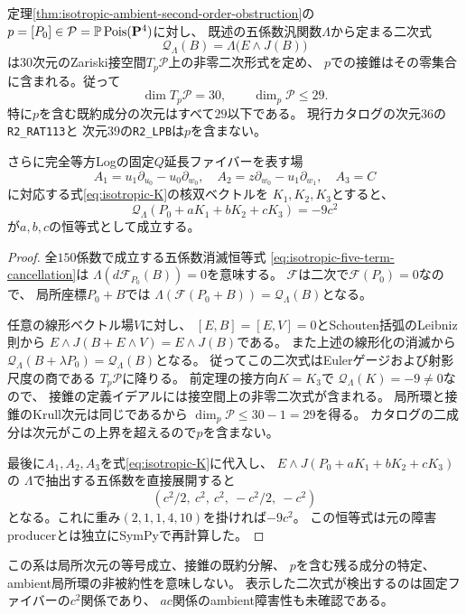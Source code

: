 \begin{corollary}[完全等方Log点での二次接錐と局所次元]
\label{cor:ambient-isotropic-tangent-cone-bound}
定理\ref{thm:isotropic-ambient-second-order-obstruction}の
$p=[P_0]\in\mathcal P=\mathbb P\operatorname{Pois}(\mathbf P^4)$に対し、
既述の五係数汎関数$\Lambda$から定まる二次式
\[
 \mathcal Q_\Lambda(B)=\Lambda\bigl(E\wedge J(B)\bigr)
\]
は$30$次元のZariski接空間$T_p\mathcal P$上の非零二次形式を定め、
$p$での接錐はその零集合に含まれる。従って
\[
 \boxed{\dim T_p\mathcal P=30,\qquad\dim_p\mathcal P\le29.}
\]
特に$p$を含む既約成分の次元はすべて$29$以下である。
現行カタログの次元$36$の\texttt{R2\_RAT113}と
次元$39$の\texttt{R2\_LPB}は$p$を含まない。

さらに完全等方Logの固定$Q$延長ファイバーを表す場
\[
 A_1=u_1\partial_{u_0}-u_0\partial_{w_0},\quad
 A_2=z\partial_{w_0}-u_1\partial_{w_1},\quad A_3=C
\]
に対応する式\eqref{eq:isotropic-K}の核双ベクトルを
$K_1,K_2,K_3$とすると、
\begin{equation}\label{eq:isotropic-tangent-slice}
 \mathcal Q_\Lambda(P_0+aK_1+bK_2+cK_3)=-9c^2
\end{equation}
が$a,b,c$の恒等式として成立する。
\end{corollary}
\begin{proof}
全$150$係数で成立する五係数消滅恒等式
\eqref{eq:isotropic-five-term-cancellation}は
$\Lambda(d\mathcal F_{P_0}(B))=0$を意味する。
$\mathcal F$は二次で$\mathcal F(P_0)=0$なので、
局所座標$P_0+B$では
$\Lambda(\mathcal F(P_0+B))=\mathcal Q_\Lambda(B)$となる。

任意の線形ベクトル場$V$に対し、
$[E,B]=[E,V]=0$とSchouten括弧のLeibniz則から
$E\wedge J(B+E\wedge V)=E\wedge J(B)$である。
また上述の線形化の消滅から
$\mathcal Q_\Lambda(B+\lambda P_0)=\mathcal Q_\Lambda(B)$となる。
従ってこの二次式はEulerゲージおよび射影尺度の商である
$T_p\mathcal P$に降りる。
前定理の接方向$K=K_3$で
$\mathcal Q_\Lambda(K)=-9\ne0$なので、
接錐の定義イデアルには接空間上の非零二次式が含まれる。
局所環と接錐のKrull次元は同じであるから
$\dim_p\mathcal P\le30-1=29$を得る。
カタログの二成分は次元がこの上界を超えるので$p$を含まない。

最後に$A_1,A_2,A_3$を式\eqref{eq:isotropic-K}に代入し、
$E\wedge J(P_0+aK_1+bK_2+cK_3)$の
$\Lambda$で抽出する五係数を直接展開すると
\[
 (c^2/2,\ c^2,\ c^2,\ -c^2/2,\ -c^2)
\]
となる。これに重み$(2,1,1,4,10)$を掛ければ$-9c^2$。
この恒等式は元の障害producerとは独立にSymPyで再計算した。
\end{proof}
\begin{remark}[未解決の局所幾何]
この系は局所次元の等号成立、接錐の既約分解、
$p$を含む残る成分の特定、ambient局所環の非被約性を意味しない。
表示した二次式が検出するのは固定ファイバーの$c^2$関係であり、
$ac$関係のambient障害性も未確認である。
\end{remark}
